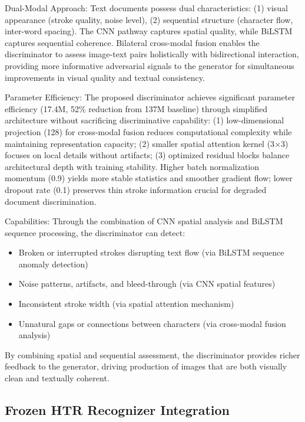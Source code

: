 \documentclass[journal]{IEEEtran}
\begin{document}
Dual-Modal Approach: Text documents possess dual characteristics: (1) visual appearance (stroke quality, noise level), (2) sequential structure (character flow, inter-word spacing). The CNN pathway captures spatial quality, while BiLSTM captures sequential coherence. Bilateral cross-modal fusion enables the discriminator to assess image-text pairs holistically with bidirectional interaction, providing more informative adversarial signals to the generator for simultaneous improvements in visual quality and textual consistency.

Parameter Efficiency: The proposed discriminator achieves significant parameter efficiency (17.4M, 52\% reduction from 137M baseline) through simplified architecture without sacrificing discriminative capability: (1) low-dimensional projection (128) for cross-modal fusion reduces computational complexity while maintaining representation capacity; (2) smaller spatial attention kernel (3$\times$3) focuses on local details without artifacts; (3) optimized residual blocks balance architectural depth with training stability. Higher batch normalization momentum (0.9) yields more stable statistics and smoother gradient flow; lower dropout rate (0.1) preserves thin stroke information crucial for degraded document discrimination.

Capabilities: Through the combination of CNN spatial analysis and BiLSTM sequence processing, the discriminator can detect:
\begin{itemize}
    \item Broken or interrupted strokes disrupting text flow (via BiLSTM sequence anomaly detection)
    \item Noise patterns, artifacts, and bleed-through (via CNN spatial features)
    \item Inconsistent stroke width (via spatial attention mechanism)
    \item Unnatural gaps or connections between characters (via cross-modal fusion analysis)
\end{itemize}

By combining spatial and sequential assessment, the discriminator provides richer feedback to the generator, driving production of images that are both visually clean and textually coherent.

\subsection{Frozen HTR Recognizer Integration}
\end{document}
